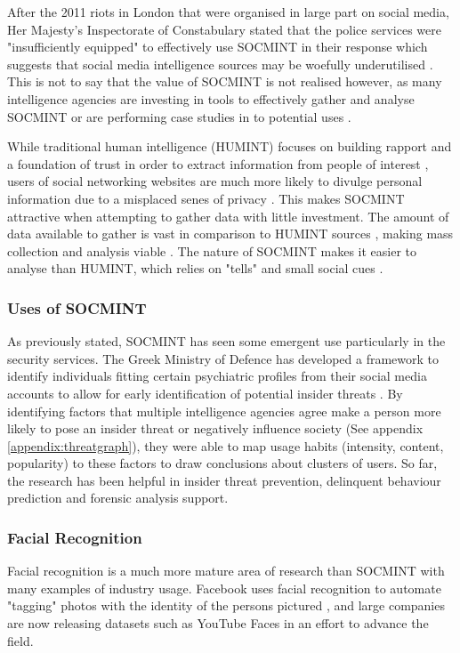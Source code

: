 \documentclass[12pt]{article}
\begin{document}
After the 2011 riots in London that were organised in large part on social media, Her Majesty's Inspectorate of Constabulary stated that the police services were "insufficiently equipped" to effectively use SOCMINT in their response \citep{socmintpublicsafety} which suggests that social media intelligence sources may be woefully underutilised \citep{socmintoverview}. This is not to say that the value of SOCMINT is not realised however, as many intelligence agencies are investing in tools to effectively gather and analyse SOCMINT \citep{socmintpublicsafety} or are performing case studies in to potential uses \citep{bostonbombingcasestudy}.

While traditional human intelligence (HUMINT) focuses on building rapport and a foundation of trust in order to extract information from people of interest \citep{humintinterrogators}, users of social networking websites are much more likely to divulge personal information due to a misplaced senes of privacy \citep{socialmediacontent}. This makes SOCMINT attractive when attempting to gather data with little investment. The amount of data available to gather is vast in comparison to HUMINT sources \citep{socmintoverview}, making mass collection and analysis viable \citep{prismslides}. The nature of SOCMINT makes it easier to analyse than HUMINT, which relies on "tells" and small social cues \citep{humintinterrogators}.

\subsubsection{Uses of SOCMINT}
As previously stated, SOCMINT has seen some emergent use particularly in the security services. The Greek Ministry of Defence has developed a framework to identify individuals fitting certain psychiatric profiles from their social media accounts to allow for early identification of potential insider threats \citep{behaviourdetection}. By identifying factors that multiple intelligence agencies agree make a person more likely to pose an insider threat or negatively influence society (See appendix \ref{appendix:threatgraph}), they were able to map usage habits (intensity, content, popularity) to these factors to draw conclusions about clusters of users. So far, the research has been helpful in insider threat prevention, delinquent behaviour prediction and forensic analysis support.

\subsubsection{Facial Recognition}
Facial recognition is a much more mature area of research than SOCMINT with many examples of industry usage. Facebook uses facial recognition to automate "tagging" photos with the identity of the persons pictured \citep{facebookfacialrecog}, and large companies are now releasing datasets such as YouTube Faces \citep{faceregiondescriptors} in an effort to advance the field.
\end{document}
